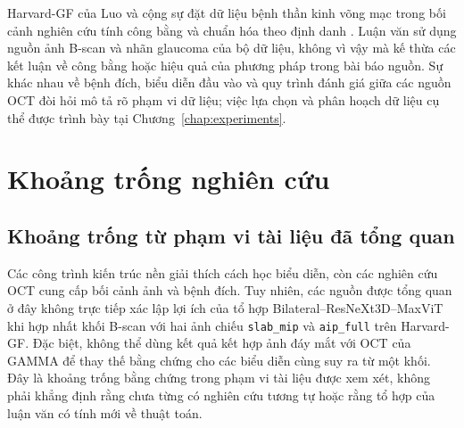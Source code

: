 \documentclass[14pt,a4paper,oneside]{extreport}
\begin{document}
Harvard-GF của Luo và cộng sự đặt dữ liệu bệnh thần kinh võng mạc
trong bối cảnh nghiên cứu tính công bằng và chuẩn hóa theo định danh
\cite{luo2024harvardgf}. Luận văn sử dụng nguồn ảnh B-scan và nhãn
glaucoma của bộ dữ liệu, không vì vậy mà kế thừa các kết luận về
công bằng hoặc hiệu quả của phương pháp trong bài báo nguồn. Sự khác
nhau về bệnh đích, biểu diễn đầu vào và quy trình đánh giá giữa các
nguồn OCT đòi hỏi mô tả rõ phạm vi dữ liệu; việc lựa chọn và phân
hoạch dữ liệu cụ thể được trình bày tại Chương~\ref{chap:experiments}.

\section{Khoảng trống nghiên cứu}
\label{sec:research-gap}
\subsection{Khoảng trống từ phạm vi tài liệu đã tổng quan}
Các công trình kiến trúc nền giải thích cách học biểu diễn, còn các
nghiên cứu OCT cung cấp bối cảnh ảnh và bệnh đích. Tuy nhiên, các
nguồn được tổng quan ở đây không trực tiếp xác lập lợi ích của tổ hợp
Bilateral--ResNeXt3D--MaxViT khi hợp nhất khối B-scan với hai ảnh chiếu
\texttt{slab\_mip} và \texttt{aip\_full} trên Harvard-GF. Đặc biệt,
không thể dùng kết quả kết hợp ảnh đáy mắt với OCT của GAMMA để thay
thế bằng chứng cho các biểu diễn cùng suy ra từ một khối. Đây là
khoảng trống bằng chứng trong phạm vi tài liệu được xem xét, không
phải khẳng định rằng chưa từng có nghiên cứu tương tự hoặc rằng tổ
hợp của luận văn có tính mới về thuật toán.
\end{document}
